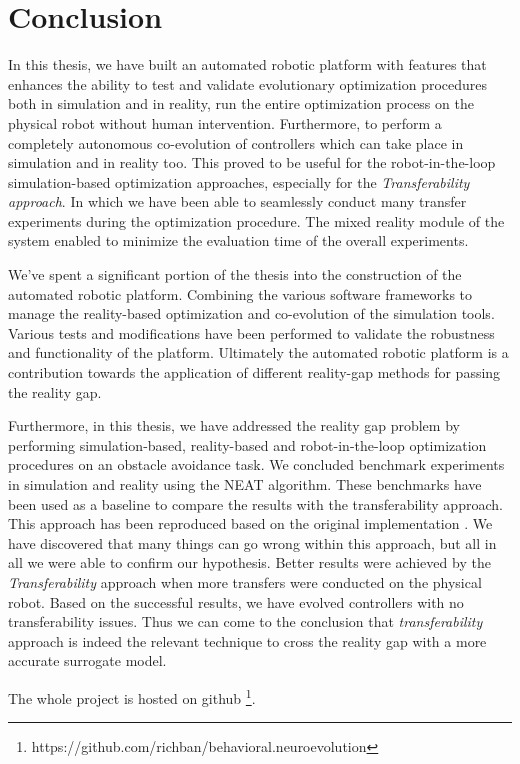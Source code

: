 \chapter{Conclusion}

In this thesis, we have built an automated robotic platform with features that enhances the ability to test and validate evolutionary optimization procedures both in simulation and in reality, run the entire optimization process on the physical robot without human intervention. Furthermore, to perform a completely autonomous co-evolution of controllers which can take place in simulation and in reality too. This proved to be useful for the robot-in-the-loop simulation-based optimization approaches, especially for the \emph{Transferability approach}. In which we have been able to seamlessly conduct many transfer experiments during the optimization procedure. The mixed reality module of the system enabled to minimize the evaluation time of the overall experiments.

We've spent a significant portion of the thesis into the construction of the automated robotic platform. Combining the various software frameworks to manage the reality-based optimization and co-evolution of the simulation tools. Various tests and modifications have been performed to validate the robustness and functionality of the platform. Ultimately the automated robotic platform is a contribution towards the application of different reality-gap methods for passing the reality gap.

Furthermore, in this thesis, we have addressed the reality gap problem by performing simulation-based, reality-based and robot-in-the-loop optimization procedures on an obstacle avoidance task. We concluded benchmark experiments in simulation and reality using the NEAT algorithm. These benchmarks have been used as a baseline to compare the results with the transferability approach. This approach has been reproduced based on the original implementation \citep{koos2012transferability}. We have discovered that many things can go wrong within this approach, but all in all we were able to confirm our hypothesis. Better results were achieved by the \emph{Transferability} approach when more transfers were conducted on the physical robot. Based on the successful results, we have evolved controllers with no transferability issues. Thus we can come to the conclusion that \emph{transferability} approach is indeed the relevant technique to cross the reality gap with a more accurate surrogate model.

The whole project is hosted on github \footnote{https://github.com/richban/behavioral.neuroevolution}.

